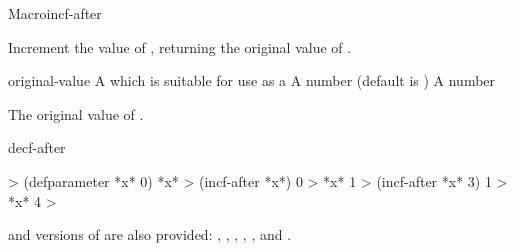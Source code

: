 \documentclass[10pt,twoside,english,pdftex]{article}
\begin{document}
\begin{functiondoc}{Macro}{incf-after}{
    }
%

\fnsyntax

\fnpurpose Increment the value of , returning the original value of
.

\fnpackage {}

\fnmodule {}

\fnargs
\begin{args}{original-value}
\arg[place] A  which is suitable for use as a 
\arg[increment] A number (default is )
 A number
\end{args}

\fnreturns The original value of .

\begin{alsos}{decf-after}
\end{alsos}

\fnexamples
\begin{example}
%
\W\supp
  > (defparameter *x* 0)
  *x*
  > (incf-after *x*)
  0 
  > *x*
  1
  > (incf-after *x* 3)
  1
  > *x*
  4
  >
\end{example}

\fnnote
%
%
%
%
%
%
%
%
 and  versions of  are also
provided: , ,
, ,
, and .

\end{functiondoc}

\end{document}
